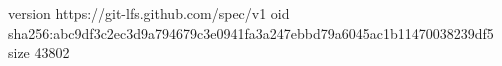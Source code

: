 version https://git-lfs.github.com/spec/v1
oid sha256:abc9df3c2ec3d9a794679c3e0941fa3a247ebbd79a6045ac1b11470038239df5
size 43802
